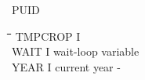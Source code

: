 \documentclass[11pt]{article}
\begin{document}
PUID\nwln
\begin{tabbing}
\hspace{1.27cm}\=\hspace{1.27cm}\=\hspace{1.27cm}\=\hspace{1.27cm}\=%
\hspace{1.27cm}\=\hspace{1.27cm}\=\hspace{1.27cm}\=\hspace{1.27cm}\=%
\hspace{1.27cm}\=\hspace{1.27cm}\=\kill
TMPCROP\> \> I\\
WAIT\> \> I\> wait-loop variable\\
YEAR\> \> I\> current year\> \> \> \> \> \> \> -
\end{tabbing}
\end{document}
